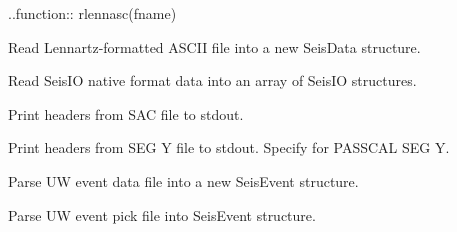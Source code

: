 \documentclass[letterpaper,11pt,english]{sphinxmanual}
\begin{document}
..function:: rlennasc(fname)

Read Lennartz-formatted ASCII file into a new SeisData structure.

\begin{fulllineitems}
\label{\detokenize{src/Formats/fileformats:rseis}}
\end{fulllineitems}


Read SeisIO native format data into an array of SeisIO structures.

\begin{fulllineitems}
\label{\detokenize{src/Formats/fileformats:sachdr}}
\end{fulllineitems}


Print headers from SAC file to stdout.

\begin{fulllineitems}
\label{\detokenize{src/Formats/fileformats:segyhdr}}
\end{fulllineitems}


Print headers from SEG Y file to stdout. Specify  for PASSCAL SEG Y.

\begin{fulllineitems}
\label{\detokenize{src/Formats/fileformats:uwdf}}
\end{fulllineitems}


Parse UW event data file  into a new SeisEvent structure.


\begin{fulllineitems}
\end{fulllineitems}


Parse UW event pick file into SeisEvent structure.
\end{document}
